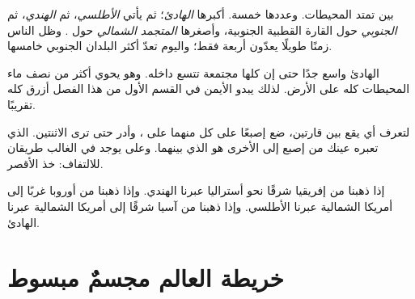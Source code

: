 بين  تمتد المحيطات. وعددها خمسة. أكبرها
\emph{ الهادئ}؛ ثم يأتي \emph{ الأطلسي}، ثم
\emph{ الهندي}، ثم \emph{ الجنوبي} حول القارة القطبية الجنوبية،
وأصغرها \emph{ المتجمد الشمالي} حول . وظل الناس زمنًا
طويلًا يعدّون أربعة فقط؛ واليوم تعدّ أكثر البلدان  الجنوبي
خامسها.

\begin{example}\label{ex:g3:continents-and-oceans:pacific}
 الهادئ واسع جدًا حتى إن  كلها مجتمعة تتسع داخله. وهو يحوي
أكثر من نصف ماء المحيطات كله على الأرض. لذلك يبدو  الأيمن في القسم
الأول من هذا الفصل أزرق كله
تقريبًا.
\end{example}

\begin{method}\label{met:g3:continents-and-oceans:between}
لتعرف أي  يقع بين قارتين، ضع إصبعًا على كل منهما على ، وأدر  حتى ترى الاثنتين.  الذي تعبره عينك من إصبع
إلى الأخرى هو الذي بينهما.
وعلى  يوجد في الغالب طريقان للالتفاف: خذ الأقصر.
\end{method}

\begin{example}\label{ex:g3:continents-and-oceans:africa-australia}
إذا ذهبنا من إفريقيا شرقًا نحو أستراليا عبرنا  الهندي. وإذا ذهبنا من
أوروبا غربًا إلى أمريكا الشمالية عبرنا  الأطلسي. وإذا ذهبنا من آسيا
شرقًا إلى أمريكا الشمالية عبرنا  الهادئ.
\end{example}

\section{خريطة العالم مجسمٌ مبسوط}


